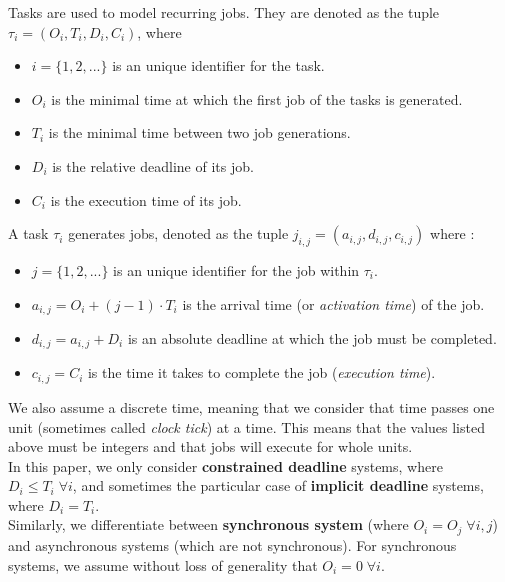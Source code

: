 \documentclass[a4paper,10pt]{article}
\begin{document}
        Tasks are used to model recurring jobs. They are denoted as the tuple $\tau_i = (O_i, T_i, D_i, C_i)$, where
        \begin{itemize}
            \item $i = \{1,2,...\}$ is an unique identifier for the task.
            \item $O_i$ is the minimal time at which the first job of the tasks is generated.
            \item $T_i$ is the minimal time between two job generations.
            \item $D_i$ is the relative deadline of its job.
            \item $C_i$ is the execution time of its job.
        \end{itemize}

        A task $\tau_i$ generates jobs, denoted as the tuple $j_{i,j} = (a_{i, j}, d_{i,j}, c_{i,j})$ where :
        \begin{itemize}
            \item $j = \{1,2,...\}$ is an unique identifier for the job within $\tau_i$.
            \item $a_{i,j} = O_i + (j-1) \cdot T_i$ is the arrival time (or \emph{activation time}) of the job.
            \item $d_{i,j} = a_{i,j} + D_i$ is an absolute deadline at which the job must be completed.
            \item $c_{i,j} = C_i$ is the time it takes to complete the job (\emph{execution time}).
        \end{itemize}

        We also assume a discrete time, meaning that we consider that time passes one unit (sometimes called \emph{clock tick}) at a time. This means that the values listed above must be integers and that jobs will execute for whole units.\\

        In this paper, we only consider \textbf{constrained deadline} systems, where $D_i \leqslant T_i \; \forall i$, and sometimes the particular case of \textbf{implicit deadline} systems, where $D_i = T_i$.\\

        Similarly, we differentiate between \textbf{synchronous system} (where $O_i = O_j \; \forall i,j$) and asynchronous systems (which are not synchronous). For synchronous systems, we assume without loss of generality that $O_i = 0 \; \forall i$.\\
\end{document}
